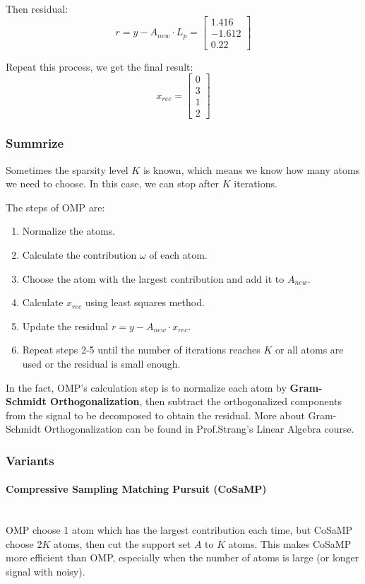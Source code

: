 \documentclass[12pt]{ctexart}
\begin{document}
Then residual:
\[
  r = y - A_{new} \cdot L_p = \begin{bmatrix} 1.416 \\ -1.612 \\ 0.22 \end{bmatrix}
\]

Repeat this process, we get the final result:
\[
  x_{rec} = \begin{bmatrix} 0 \\ 3 \\ 1 \\ 2 \end{bmatrix}
\]

\subsubsection{\textbf{Summrize}}

Sometimes the sparsity level $K$ is known, which means we know how many atoms we need
to choose. In this case, we can stop after $K$ iterations.

The steps of OMP are:
\begin{enumerate}
  \item Normalize the atoms.
  \item Calculate the contribution $\omega$ of each atom.
  \item Choose the atom with the largest contribution and add it to $A_{new}$.
  \item Calculate $x_{rec}$ using least squares method.
  \item Update the residual $r = y - A_{new} \cdot x_{rec}$.
  \item Repeat steps 2-5 until the number of iterations reaches $K$ or all atoms are
  used or the residual is small enough.
\end{enumerate}

In the fact, OMP's calculation step is to normalize each atom by \textbf{Gram-Schmidt
Orthogonalization}, then subtract the orthogonalized components from the signal to be
decomposed to obtain the residual. More about Gram-Schmidt Orthogonalization
can be found in Prof.Strang's Linear Algebra course.

\subsubsection{\textbf{Variants}}

\paragraph{\textbf{Compressive Sampling Matching Pursuit (CoSaMP)}}\mbox{}\\
OMP choose 1 atom which has the largest contribution each time, but CoSaMP choose
$2K$ atoms, then cut the support set $A$ to $K$ atoms. This makes CoSaMP more
efficient than OMP, especially when the number of atoms is large (or longer
signal with noisy).
\end{document}
